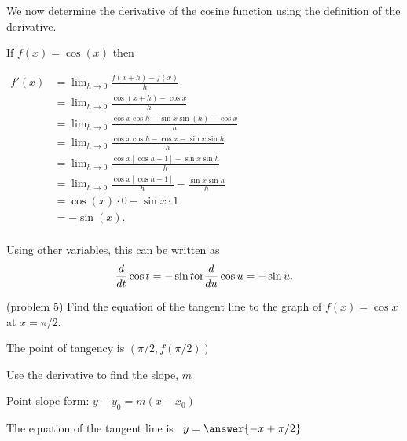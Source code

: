 \documentclass[handout]{ximera}
\begin{document}

We now determine the derivative of the cosine function using the definition of the derivative.

\begin{explanation}
If $f(x) = \cos(x)$ then\\
\begin{center}
$\begin{aligned}
f'(x) &= \lim_{h \to 0} \frac{f(x+h)-f(x)}{h} \\[5pt]
&= \lim_{h \to 0} \frac{\cos(x+h) - \cos x}{h}\\[5pt]
&=  \lim_{h \to 0} \frac{\cos x\cos h - \sin x\sin(h) - \cos x}{h}\\[5pt]
&=  \lim_{h \to 0} \frac{\cos x\cos h - \cos x - \sin x\sin h}{h}\\[5pt]
&=  \lim_{h \to 0} \frac{\cos x[\cos h -1] - \sin x\sin h}{h}\\[5pt]
&=  \lim_{h \to 0} \frac{\cos x[\cos h -1]}{h} - \frac{\sin x\sin h}{h}\\[5pt]
&=   \cos(x) \cdot 0 - \sin x\cdot 1\\[5pt]
&= -\sin(x).\\[5pt]
\end{aligned}$
\end{center}
Using other variables, this can be written as
\[
\frac{d}{dt} \cos t = -\sin t \\
\text{or}\\
\frac{d}{du} \cos u = -\sin u.
\]

\end{explanation}


\begin{problem}(problem 5)
Find the equation of the tangent line to the graph of $f(x) = \cos x$ at $x=\pi/2.$


\begin{hint}
The point of tangency is $(\pi/2, f(\pi/2))$
\end{hint}
\begin{hint}
Use the derivative to find the slope, $m$
\end{hint}
\begin{hint}
Point slope form: $y-y_0 = m(x-x_0)$
\end{hint}

The equation of the tangent line is \ $y = \answer{-x + \pi/2}$

\end{problem}
\end{document}
